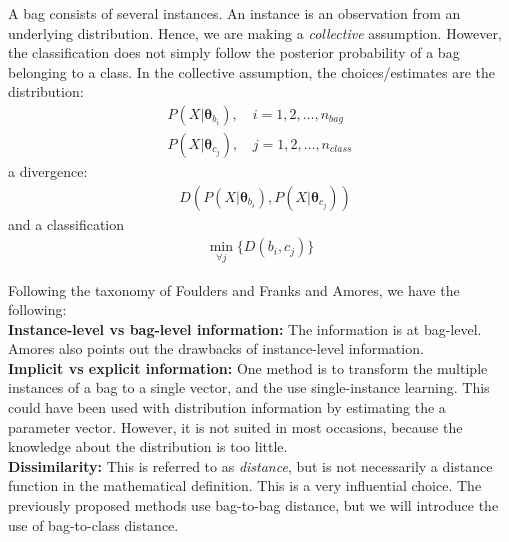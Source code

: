 A bag consists of several instances. 
An instance is an observation from an underlying distribution. Hence, we are making a {\it collective} assumption.
However, the classification does not simply follow the posterior probability of a bag belonging to a class. 
In the collective assumption, the choices/estimates are
the distribution:\\
\begin{align}
  P(X|\mathbf{\theta}_{b_i}), \, &i = 1, 2, \ldots, n_{bag} \\
  P(X|\mathbf{\theta}_{c_j}), \, & j = 1, 2, \ldots, n_{class}
\end{align}
a divergence: \\
\begin{align}
  & D(P(X|\mathbf{\theta}_{b_i}), P(X|\mathbf{\theta}_{c_j}))
\end{align}
and a classification 
\begin{align}
  \min_{\forall j} \{ D(b_i, c_j)\}
\end{align}

Following the taxonomy of Foulders and Franks and Amores, we have the following: \\
{ \bf Instance-level vs bag-level information:} 
The information is at bag-level. 
Amores also points out the drawbacks of instance-level information. \\
{\bf Implicit vs explicit information:} 
One method is to transform the multiple instances of a bag to a single vector, and the use single-instance learning. 
This could have been used with distribution information by estimating the a parameter vector. 
However, it is not suited in most occasions, because the knowledge about the distribution is too little. \\
{\bf Dissimilarity:} 
This is referred to as {\it distance}, but is not necessarily a distance function in the mathematical definition. 
This is a very influential choice. 
The previously proposed methods use bag-to-bag distance, but we will introduce the use of bag-to-class distance. 

